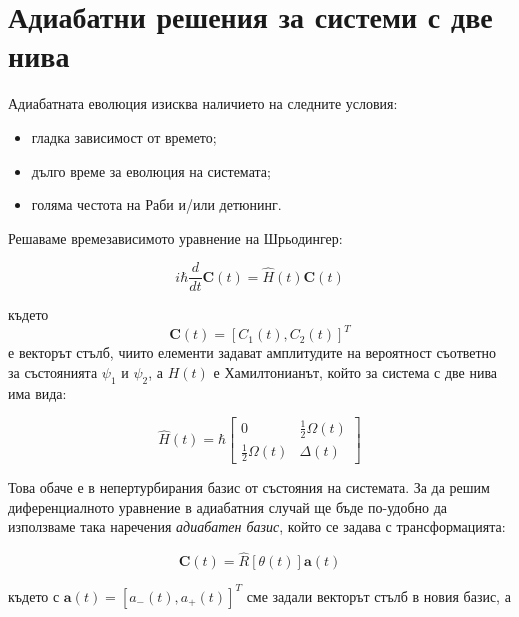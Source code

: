\chapter{Адиабатни решения за системи с две нива}

    Адиабатната еволюция изисква наличието на следните условия:

    \begin{itemize}
        \item гладка зависимост от времето;
        \item дълго време за еволюция на системата;
        \item голяма честота на Раби и/или детюнинг.
    \end{itemize}

    Решаваме времезависимото уравнение на Шрьодингер:

    \begin{equation} \label{3.1}
        i\hbar \frac{d}{dt}\mathbf{C}(t) = \hat{H}(t)\mathbf{C}(t)
    \end{equation}

    където
    \begin{equation}
        \mathbf{C}(t) = [C_1(t), C_2(t)]^T
    \end{equation}
    е векторът стълб, чиито елементи задават амплитудите на вероятност съответно за състоянията $\psi_1$ и $\psi_2$, а $H(t)$ е Хамилтонианът, който за система с две нива има вида:

    \begin{equation}
        \hat{H}(t) = \hbar
        \begin{bmatrix}
            0 & \frac{1}{2}  \Omega (t) \\
            \frac{1}{2}  \Omega (t) & \Delta (t)
        \end{bmatrix}
    \end{equation}

    Това обаче е в непертурбирания базис от състояния на системата. За да решим диференциалното уравнение в адиабатния случай ще бъде по-удобно да използваме така наречения
    \textit{адиабатен базис}, който се задава с трансформацията:

    \begin{equation} \label{3.4}
        \mathbf{C}(t) = \hat{R}[\theta(t)]\mathbf{a}(t)
    \end{equation}

    където с $\mathbf{a}(t) = [a_-(t), a_+(t)]^T$ сме задали векторът стълб в новия базис, а

